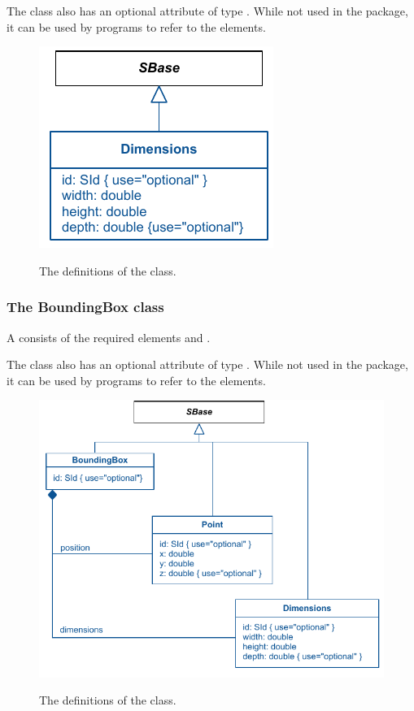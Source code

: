 The \Dimensions class also has an optional attribute  of type 
. While not used in the \Layout package, it can be used 
by programs to refer to the elements. 


\begin{figure}[!h]
\includegraphics{uml/layout-dimensions-uml}\\
\label{uml:dimensions}
\caption{The definitions of the \Dimensions class.}
\end{figure}
 \subsubsection{The BoundingBox class} \label{boundingbox-class} A 
\BoundingBox consists of the required elements  and . 

The \BoundingBox class also has an optional attribute  of type 
. While not used in the \Layout package, it can be used 
by programs to refer to the elements. 

\begin{figure}[!h]
\includegraphics{uml/layout-boundingbox-uml}\\
\label{uml:boundingbox}
\caption{The definitions of the \BoundingBox class.}
\end{figure}

